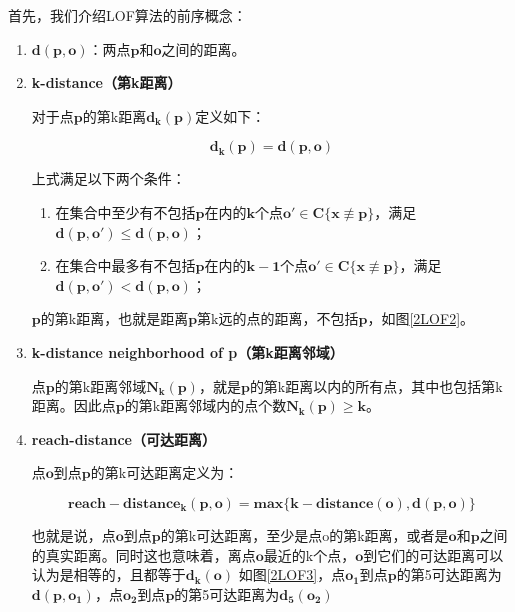 \documentclass[a4paper,AutoFakeBold,oneside,12pt]{book}
\begin{document}
	首先，我们介绍LOF算法的前序概念：
	\begin{enumerate}
	\item \textbf{$\bm{d(p,o)}$}：两点$\bm{p}$和$\bm{o}$之间的距离。
	\item \textbf{k-distance（第k距离）}
	
	对于点$\bm{p}$的第k距离$\bm{d_k(p)}$定义如下：
	
	\begin{equation}
	\bm{d_k(p)}=\bm{d(p,o)}
	\end{equation}
	
	上式满足以下两个条件：
	\begin{enumerate}
	\item 在集合中至少有不包括$\bm{p}$在内的$\bm{k}$个点$\bm{o'}\in\bm{C\{x\not\equiv p\}}$，满足$\bm{d(p,o')}\leq\bm{d(p,o)}$； 
	\item 在集合中最多有不包括$\bm{p}$在内的$\bm{k-1}$个点$\bm{o'}\in\bm{C\{x\not\equiv p\}}$，满足$\bm{d(p,o')}<\bm{d(p,o)}$； 
	\end{enumerate}
	
	$\bm{p}$的第k距离，也就是距离$\bm{p}$第k远的点的距离，不包括$\bm{p}$，如图\ref{2LOF2}。 


	\item \textbf{k-distance neighborhood of p（第k距离邻域）}

	点$\bm{p}$的第k距离邻域$\bm{N_k(p)}$，就是$\bm{p}$的第k距离以内的所有点，其中也包括第k距离。因此点$\bm{p}$的第k距离邻域内的点个数$\bm{N_k(p)}\ge\bm{k}$。

	\item \textbf{reach-distance（可达距离）}
	
	点$\bm{o}$到点$\bm{p}$的第k可达距离定义为：

	\begin{equation}
	\label{kreach}
	\bm{reach}-\bm{distance_k(p,o)}=\bm{max\{k-distance(o),d(p,o)\}}
	\end{equation}

	 也就是说，点$\bm{o}$到点$\bm{p}$的第k可达距离，至少是点o的第k距离，或者是$\bm{o}$和$\bm{p}$之间的真实距离。同时这也意味着，离点$\bm{o}$最近的k个点，$\bm{o}$到它们的可达距离可以认为是相等的，且都等于$\bm{d_k(o)}$
	如图\ref{2LOF3}，点$\bm{o_1}$到点$\bm{p}$的第5可达距离为$\bm{d(p,o_1)}$，点$\bm{o_2}$到点$\bm{p}$的第5可达距离为$\bm{d_5(o_2)}$



\end{enumerate}
\end{document}
